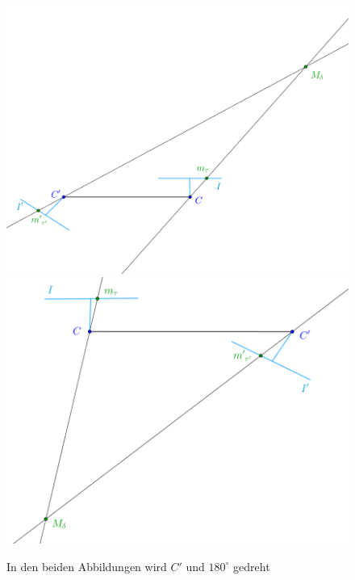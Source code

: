 \begin{figure}[!htb]
	\includegraphics[width=\linewidth]{images/P_Solution_three.png}
	\endminipage\hfill
	\includegraphics[width=\linewidth]{images/P_Solution_four.png}
	\endminipage\hfill
	\caption[Bestimmung extrinsischer Kameraparameter Lösung eins und zwei]{In den beiden Abbildungen wird $C'$ und $180^\circ$ gedreht}
	\label{fig:T_2}
\end{figure}
\pagebreak

